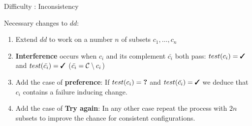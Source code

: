 \begin{frame}{Difficulty : Inconsistency}
	
	Necessary changes to $dd$:
	\begin{enumerate}
		\item Extend $dd$ to work on a number $n$ of subsets $c_1, \dots, c_n$
		\item \textbf{Interference} occurs when $c_i$ and its complement $\bar{c_i}$ both pass: $test(c_i) = \cmark$ and $test(\bar{c_i}) = \cmark$ ($\bar{c_i}=\mathcal{C} \setminus c_i$)
		\item Add the case of \textbf{preference}: If $test(c_i)=\textbf{?}$ and $test(\bar{c_i})=\cmark$ we deduce that $c_i$ contains a failure inducing change. 
		\item Add the case of \textbf{Try again}: In any other case repeat the process with $2n$ subsets to improve the chance for consistent configurations.
	\end{enumerate}
\end{frame}